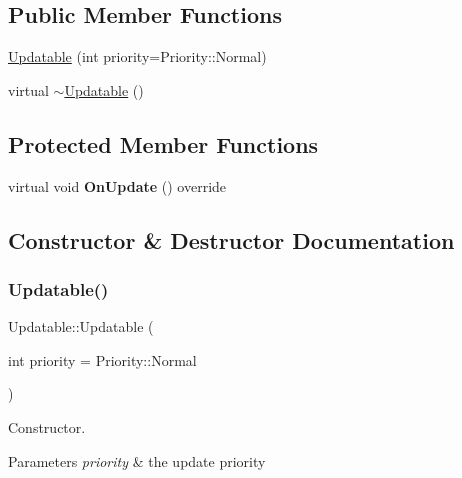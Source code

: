 \subsection*{Public Member Functions}
\begin{DoxyCompactItemize}
\item 
\hyperlink{classUpdatable_aa4ee7591724b29111625c33566823d96}{Updatable} (int priority=Priority\+::\+Normal)
\item 
virtual \hyperlink{classUpdatable_a14d2de14ddf39b0170e09b7831ccec24}{$\sim$\+Updatable} ()
\end{DoxyCompactItemize}
\subsection*{Protected Member Functions}
\begin{DoxyCompactItemize}
\item 
\mbox{\label{classUpdatable_a092629317e13ed9b228635a8fb6789d3}} 
virtual void {\bfseries On\+Update} () override
\end{DoxyCompactItemize}


\subsection{Constructor \& Destructor Documentation}
\mbox{\label{classUpdatable_aa4ee7591724b29111625c33566823d96}} 
\subsubsection{\texorpdfstring{Updatable()}{Updatable()}}
{\footnotesize\ttfamily Updatable\+::\+Updatable (\begin{DoxyParamCaption}\item[{int}]{priority = {\ttfamily Priority\+:\+:Normal} }\end{DoxyParamCaption})}

Constructor.


\begin{DoxyParams}{Parameters}
{\em priority} & the update priority \\
\hline
\end{DoxyParams}
\mbox{\label{classUpdatable_a14d2de14ddf39b0170e09b7831ccec24}} 
